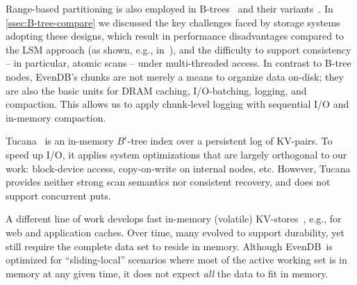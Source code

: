 \documentclass[sigplan,10pt]{acmart}
\newcommand{\remove}[1]{}
\newcommand{\sys}{EvenDB}
\begin{document}
Range-based  partitioning is also employed in  B-trees~\cite{Knuth:1998:ACP:280635} and their variants~\cite{Brodal:2003:LBE:644108.644201}. In
 \cref{ssec:B-tree-compare} we discussed the key challenges faced by storage systems adopting these designs, which 
 result in performance disadvantages compared to the LSM approach  (as shown, e.g., in~\cite{toku-rocks-inno}), 
 and the difficulty to support consistency  -- in particular, atomic scans --   under multi-threaded access.
 In contrast to B-tree nodes, \sys's chunks are not merely  a means to organize data on-disk; they 
are also the basic units for DRAM caching, I/O-batching, logging, and compaction. 
This allows us to apply chunk-level logging with sequential I/O and in-memory compaction.

 \remove{
 , which suffer from a write bottleneck in random updates to 
leaf blocks. \sys\/ overcomes this limitation through (1) transforming random I/O to sequential I/O at the chunk level, 
(2) managing a write-through chunk cache in memory (munks), and (3) reducing I/O  through in-memory (munk) compaction. 

A $B^{\epsilon}$-tree~\cite{Brodal:2003:LBE:644108.644201} is a B-tree variant that uses overflow write buffers in internal nodes. 
This design speeds up writes and reduces write amplification, however lookups are slowed down by having to search in unordered 
buffers. $B^{\epsilon}$-trees have been used in KV-stores (TokuDB~\cite{TokuDB}) and filesystems (BetrFS~\cite{BetrFS}).  
}

Tucana~\cite{tucana} is an in-memory $B^{\epsilon}$-tree index over a persistent log of KV-pairs. To speed up I/O, it
applies  system optimizations that are largely orthogonal to our work: block-device  access, copy-on-write on internal nodes, etc. However, Tucana provides neither strong scan semantics nor consistent recovery, and does not support concurrent puts.

A different line of work develops fast
in-memory (volatile) KV-stores~\cite{ignite, redis, memcached, Srinivasan:2016:AAR:3007263.3007276}, 
e.g., for web and application caches. Over time, many evolved to support durability,
yet still require the complete data set to reside in memory.
Although \sys\ is optimized for ``sliding-local'' scenarios where most of the active working set is in memory at any given time, it does not expect \emph{all} the data to fit in memory. 
\end{document}
